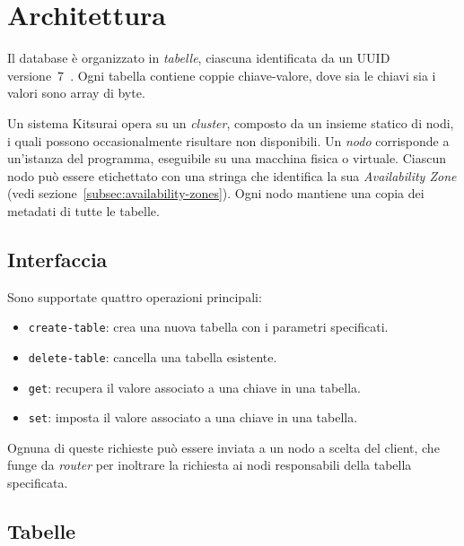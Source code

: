 \section{Architettura}
\label{sec:architettura}


Il database è organizzato in \emph{tabelle}, ciascuna identificata da un UUID versione~7~\cite{rfc9562}.
Ogni tabella contiene coppie chiave-valore, dove sia le chiavi sia i valori sono array di byte.

Un sistema Kitsurai opera su un \emph{cluster}, composto da un insieme statico di nodi, i quali possono occasionalmente risultare non disponibili.
Un \emph{nodo} corrisponde a un'istanza del programma, eseguibile su una macchina fisica o virtuale.
Ciascun nodo può essere etichettato con una stringa che identifica la sua \emph{Availability Zone} (vedi sezione~\ref{subsec:availability-zones}).
Ogni nodo mantiene una copia dei metadati di tutte le tabelle.

\subsection{Interfaccia}
\label{subsec:interfaccia}

Sono supportate quattro operazioni principali:
\begin{itemize}
    \item \texttt{create-table}: crea una nuova tabella con i parametri specificati.
    \item \texttt{delete-table}: cancella una tabella esistente.
    \item \texttt{get}: recupera il valore associato a una chiave in una tabella.
    \item \texttt{set}: imposta il valore associato a una chiave in una tabella.
\end{itemize}

Ognuna di queste richieste può essere inviata a un nodo a scelta del client, che funge da \emph{router} per inoltrare la richiesta ai nodi responsabili della tabella specificata.

\subsection{Tabelle}
\label{subsec:tabelle}

